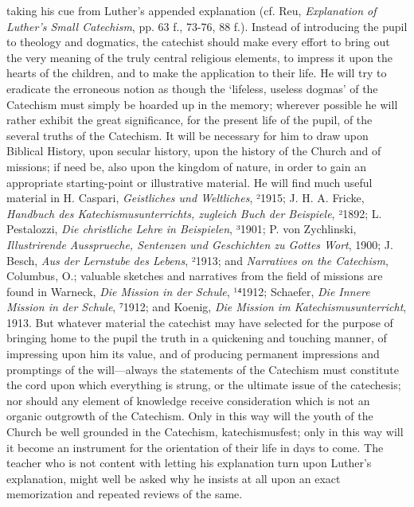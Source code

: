 taking his cue from Luther’s appended explanation (cf. Reu, \emph{Explanation of Luther’s Small Catechism}, pp. 63 f., 73-76, 88 f.). Instead of introducing the pupil to theology and dogmatics, the catechist should make every effort to bring out the very meaning of the truly central religious elements, to impress it upon the hearts of the children, and to make the application to their life. He will try to eradicate the erroneous notion as though the ‘lifeless, useless dogmas’ of the Catechism must simply be hoarded up in the memory; wherever possible he will rather exhibit the great significance, for the present life of the pupil, of the several truths of the Catechism. It will be necessary for him to draw upon Biblical History, upon secular history, upon the history of the Church and of missions; if need be, also upon the kingdom of nature, in order to gain an appropriate starting-point or illustrative material. He will find much useful material in H. Caspari, \emph{Geistliches und Weltliches}, ²1915; J. H. A. Fricke, \emph{Handbuch des Katechismusunterrichts, zugleich Buch der Beispiele}, ²1892; L. Pestalozzi, \emph{Die christliche Lehre in Beispielen}, ³1901; P. von Zychlinski, \emph{Illustrirende Aussprueche, Sentenzen und Geschichten zu Gottes Wort}, 1900; J. Besch, \emph{Aus der Lernstube des Lebens}, ²1913; and \emph{Narratives on the Catechism}, Columbus, O.; valuable sketches and narratives from the field of missions are found in Warneck, \emph{Die Mission in der Schule}, ¹⁴1912; Schaefer, \emph{Die Innere Mission in der Schule}, ⁷1912; and Koenig, \emph{Die Mission im Katechismusunterricht}, 1913. But whatever material the catechist may have selected for the purpose of bringing home to the pupil the truth in a quickening and touching manner, of impressing upon him its value, and of producing permanent impressions and promptings of the will—always the statements of the Catechism must constitute the cord upon which everything is strung, or the ultimate issue of the catechesis; nor should any element of knowledge receive consideration
which is not an organic outgrowth of the Catechism. Only in this way will the youth of the Church be well grounded in the Catechism, katechismusfest; only in this way will it become an instrument for the orientation of their life in days to come. The teacher who is not content with letting his explanation turn upon Luther’s explanation, might well be asked why he insists at all upon an exact memorization and repeated reviews of the same.

